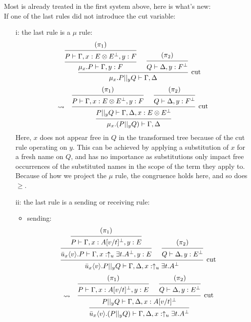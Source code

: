 \documentclass[a4paper,12pt]{article}
\begin{document}
\begin{myproof}
Most is already treated in the first system above, here is what's new:\\
If one of the last rules did not introduce the cut variable:
\begin{itemize}
	\item[i:] the last rule is a $\mu$ rule:
		\[
			\begin{prooftree}
						\hypo{(\pi_1)}
					\infer1{P \vdash \Gamma,x:E\logtensor E^\bot,y:F}
				\infer1{\mu_x.P \vdash \Gamma,y:F}
					\hypo{(\pi_2)}
				\infer1{Q \vdash \Delta,y:F^\bot}
			\infer2[cut]{\mu_x.P ||_y Q \vdash \Gamma,\Delta}
			\end{prooftree}
		\]\[
			\leadsto\;\;\;
			\begin{prooftree}
						\hypo{(\pi_1)}
					\infer1{P \vdash \Gamma,x:E\logtensor E^\bot,y:F}
						\hypo{(\pi_2)}
					\infer1{Q \vdash \Delta,y:F^\bot}
				\infer2[cut]{P ||_y Q \vdash \Gamma,\Delta,x:E\logtensor E^\bot}
			\infer1{\mu_x.(P ||_y Q) \vdash \Gamma,\Delta}
			\end{prooftree}
		\]
		Here, $x$ does not appear free in $Q$ in the transformed tree because of the cut rule operating on $y$. This can be achieved by applying a substitution of $x$ for a fresh name on $Q$, and has no importance as substitutions only impact free occurrences of the substituted names in the scope of the term they apply to.\\
		Because of how we project the $\mu$ rule, the congruence holds here, and so does $\geq$.
	\item[ii:] the last rule is a sending or receiving rule:\\
	\begin{itemize}
		\item sending:
		\[
			\begin{prooftree}
						\hypo{(\pi_1)}
					\infer1{P \vdash \Gamma,x:A[v/t]^\bot,y:E}
				\infer1{\bar{u}_x\langle v\rangle.P \vdash \Gamma,x:\uparrow_u\exists t.A^\bot,y:E}
					\hypo{(\pi_2)}
				\infer1{Q \vdash \Delta,y:E^\bot}
			\infer2[cut]{\bar{u}_x\langle v\rangle.P ||_y Q \vdash \Gamma,\Delta,x:\uparrow_u\exists t.A^\bot}
			\end{prooftree}
		\]\[
			\leadsto\;\;\;
			\begin{prooftree}
						\hypo{(\pi_1)}
					\infer1{P \vdash \Gamma,x:A[v/t]^\bot,y:E}
						\hypo{(\pi_2)}
					\infer1{Q \vdash \Delta,y:E^\bot}
				\infer2[cut]{P||_yQ \vdash \Gamma,\Delta,x:A[v/t]^\bot}
			\infer1{\bar{u}_x\langle v\rangle.(P||_yQ) \vdash \Gamma,\Delta,x:\uparrow_u\exists t.A^\bot}

\end{prooftree}\]
\end{itemize}
\end{itemize}
\end{myproof}
\end{document}
